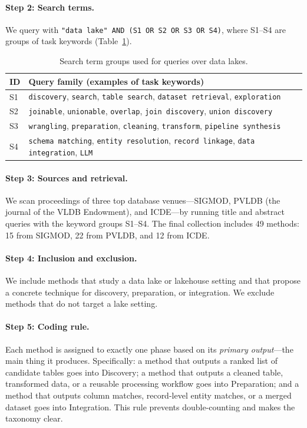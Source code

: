 \documentclass[sigconf,nonacm]{acmart}
\newcommand{\tbl}{%
  \scriptsize
  \setlength{\tabcolsep}{4pt}%
  \renewcommand{\arraystretch}{1.12}%
}
\begin{document}
\paragraph{Step 2: Search terms.}
We query with \texttt{"data lake" AND (S1 OR S2 OR S3 OR S4)}, where S1--S4 are groups of task keywords (Table~\ref{tab:search-strings}).


\begin{table}[!htbp]
\caption{Search term groups used for queries over data lakes.}
\label{tab:search-strings}
\centering
\tbl
\begin{tabularx}{\columnwidth}{@{}p{8mm}X@{}}
\toprule
\textbf{ID} & \textbf{Query family (examples of task keywords)} \\
\midrule
S1 & \texttt{discovery}, \texttt{search}, \texttt{table search}, \texttt{dataset retrieval}, \texttt{exploration} \\
S2 & \texttt{joinable}, \texttt{unionable}, \texttt{overlap}, \texttt{join discovery}, \texttt{union discovery} \\
S3 & \texttt{wrangling}, \texttt{preparation}, \texttt{cleaning}, \texttt{transform}, \texttt{pipeline synthesis} \\
S4 & \texttt{schema matching}, \texttt{entity resolution}, \texttt{record linkage}, \texttt{data integration}, \texttt{LLM} \\
\bottomrule
\end{tabularx}
\end{table}

\paragraph{Step 3: Sources and retrieval.}
We scan proceedings of three top database venues---SIGMOD, PVLDB (the journal of the VLDB Endowment), and ICDE---by running title and abstract queries with the keyword groups S1--S4.
The final collection includes 49 methods: 15 from SIGMOD, 22 from PVLDB, and 12 from ICDE.

\paragraph{Step 4: Inclusion and exclusion.}
We include methods that study a data lake or lakehouse setting and that propose a concrete technique for discovery, preparation, or integration. We exclude methods that do not target a lake setting.

\paragraph{Step 5: Coding rule.}
Each method is assigned to exactly one phase based on its \emph{primary output}---the main thing it produces. Specifically: a method that outputs a ranked list of candidate tables goes into Discovery; a method that outputs a cleaned table, transformed data, or a reusable processing workflow goes into Preparation; and a method that outputs column matches, record-level entity matches, or a merged dataset goes into Integration. This rule prevents double-counting and makes the taxonomy clear.
\end{document}
